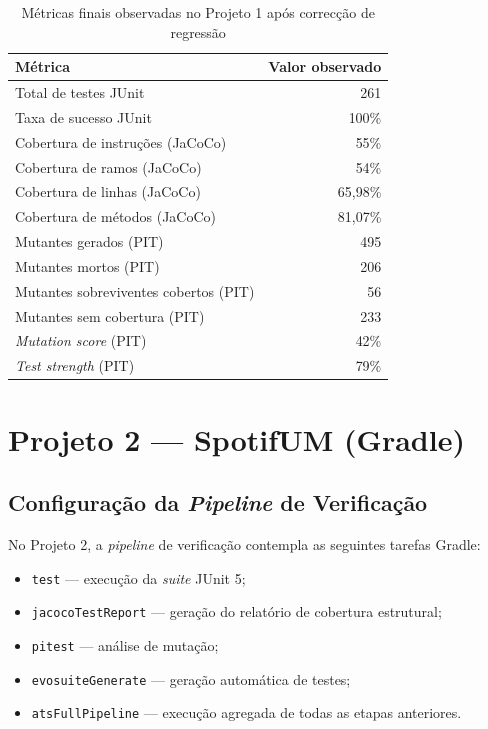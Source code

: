 \documentclass{article}
\begin{document}
\begin{table}[H]
\centering
\begin{tabular}{lr}
\toprule
Métrica & Valor observado \\
\midrule
Total de testes JUnit & 261 \\
Taxa de sucesso JUnit & 100\% \\
Cobertura de instruções (JaCoCo) & 55\% \\
Cobertura de ramos (JaCoCo) & 54\% \\
Cobertura de linhas (JaCoCo) & 65,98\% \\
Cobertura de métodos (JaCoCo) & 81,07\% \\
Mutantes gerados (PIT) & 495 \\
Mutantes mortos (PIT) & 206 \\
Mutantes sobreviventes cobertos (PIT) & 56 \\
Mutantes sem cobertura (PIT) & 233 \\
\emph{Mutation score} (PIT) & 42\% \\
\emph{Test strength} (PIT) & 79\% \\
\bottomrule
\end{tabular}
\caption{Métricas finais observadas no Projeto 1 após correcção de regressão}
\end{table}

\section{Projeto 2 --- SpotifUM (Gradle)}

\subsection{Configuração da \emph{Pipeline} de Verificação}

No Projeto 2, a \emph{pipeline} de verificação contempla as seguintes tarefas Gradle:
\begin{itemize}
    \item \texttt{test} --- execução da \emph{suite} JUnit 5;
    \item \texttt{jacocoTestReport} --- geração do relatório de cobertura estrutural;
    \item \texttt{pitest} --- análise de mutação;
    \item \texttt{evosuiteGenerate} --- geração automática de testes;
    \item \texttt{atsFullPipeline} --- execução agregada de todas as etapas anteriores.
\end{itemize}
\end{document}
